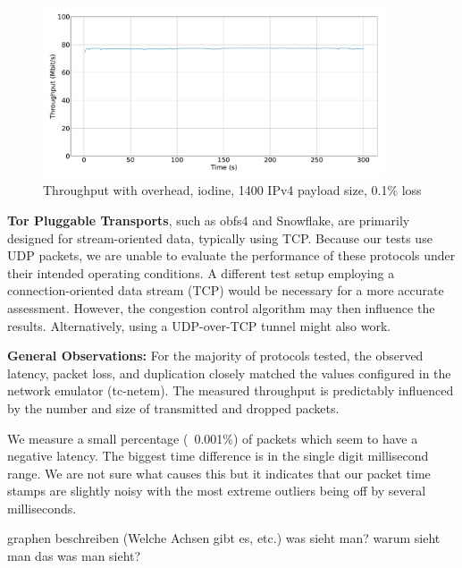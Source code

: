 \begin{figure}[tbh]
	\centering
	\includegraphics[draft=false,width=0.9\textwidth]{figures/Graphs/graph-5-iodine-constant-throughput/throughput.pdf}
	\caption{Throughput with overhead, iodine, 1400 IPv4 payload size, 0.1\% loss}
	\label{fig:graph-5-iodine-constant-throughput}
\end{figure}


\textbf{Tor Pluggable Transports}, such as obfs4 and Snowflake, are primarily designed for stream-oriented data, typically using TCP.
Because our tests use UDP packets, we are unable to evaluate the performance of these protocols under their intended operating conditions.
A different test setup employing a connection-oriented data stream (TCP) would be necessary for a more accurate assessment.
However, the congestion control algorithm may then influence the results.
Alternatively, using a UDP-over-TCP tunnel might also work.


\noindent\textbf{General Observations:}
For the majority of protocols tested, the observed latency, packet loss, and duplication closely matched the values configured in the network emulator (tc-netem).
The measured throughput is predictably influenced by the number and size of transmitted and dropped packets.

We measure a small percentage (~0.001\%) of packets which seem to have a negative latency.
The biggest time difference is in the single digit millisecond range.
We are not sure what causes this but it indicates that our packet time stamps are slightly noisy with the most extreme outliers being off by several milliseconds.




graphen beschreiben (Welche Achsen gibt es, etc.)
was sieht man?
warum sieht man das was man sieht?

